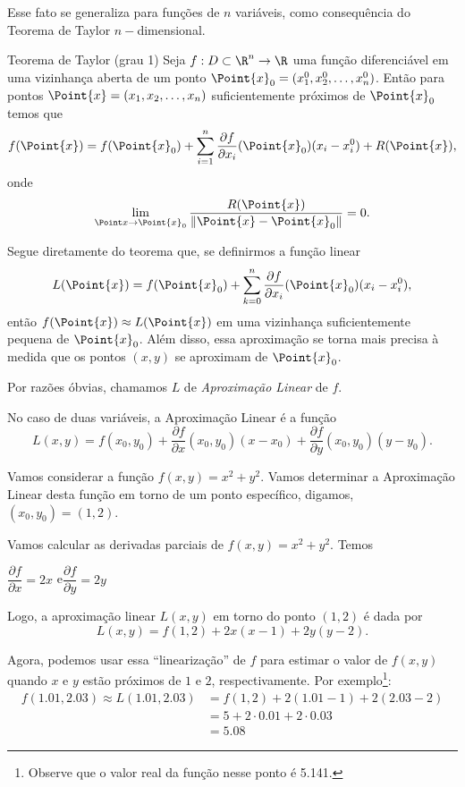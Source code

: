 Esse fato se generaliza para funções de $n$ variáveis, como consequência do Teorema de Taylor $n-$dimensional.
\begin{theorem}{Teorema de Taylor  (grau 1)}{}
    Seja $f:D\subset\R^n\to\R$ uma função diferenciável em uma vizinhança aberta de um ponto $\Point{x}_0=(x_1^0,x_2^0,\dots,x_n^0)$. Então para pontos $\Point{x}=(x_1,x_2,\dots,x_n)$ suficientemente próximos de $\Point{x}_0$ temos que
    $$f(\Point{x})=f(\Point{x}_0) + \sum_{i=1}^n \dfrac{\partial f}{\partial x_i} (\Point{x}_0) (x_i-x_i^0) + R(\Point{x}),$$
    onde 
    $$\lim_{\Point x \rightarrow \Point{x}_0} \dfrac{R(\Point{x})}{\|\Point{x}-\Point{x}_0\|}=0. $$
\end{theorem}
Segue diretamente do teorema que, se definirmos a função linear 
\begin{equation}\label{approx_linear_n}
    L(\Point{x})=f(\Point{x}_0) + \sum_{k=0}^n \dfrac{\partial f}{\partial x_i} (\Point{x}_0) (x_i-x_i^0),
\end{equation} 
então $f(\Point{x})\approx L(\Point{x})%
$ 
em uma vizinhança suficientemente pequena de $\Point{x}_0$. Além disso, essa aproximação se torna mais precisa à medida que os pontos \((x, y)\) se aproximam de \(\Point{x}_0\).


Por razões óbvias, chamamos $L$ de \textit{Aproximação Linear} de $f$. 


No caso de duas variáveis, a Aproximação Linear é a função 
\begin{equation}\label{aprox_linear}
    L(x,y)= f(x_0,y_0) + \dfrac{\partial f}{\partial x}(x_0,y_0) (x-x_0) + \dfrac{\partial f}{\partial y}(x_0,y_0) (y- y_0) . 
\end{equation}




\begin{example}{}{}
Vamos considerar a função \(f(x, y) = x^2 + y^2\). Vamos determinar a Aproximação Linear desta função em torno de um ponto específico, digamos, \((x_0, y_0) = (1, 2)\).

Vamos calcular as derivadas parciais de \(f(x, y) = x^2 + y^2\). Temos
\begin{center}
\(\dfrac{\partial f}{\partial x} = 2x\)
\quad e\quad \(\dfrac{\partial f}{\partial y} = 2y\)
\end{center}
Logo, a aproximação linear \(L(x, y)\) em torno do ponto \((1, 2)\) é dada por
\[L(x, y) = f(1, 2) + 2x(x - 1) + 2y(y - 2).\]

Agora, podemos usar essa ``linearização'' de $f$ para estimar o valor de \(f(x, y)\) quando \(x\) e \(y\) estão próximos de \(1\) e \(2\), respectivamente.
Por exemplo\footnote{Observe que o valor real da função nesse ponto é 5.141.}:
\begin{align*}
f(1.01, 2.03)\approx L(1.01, 2.03) & = f(1, 2) + 2(1.01 - 1) + 2(2.03 - 2)\\
&= 5 + 2\cdot 0.01 +2\cdot 0.03 \\
&= 5.08
\end{align*}

\end{example}




